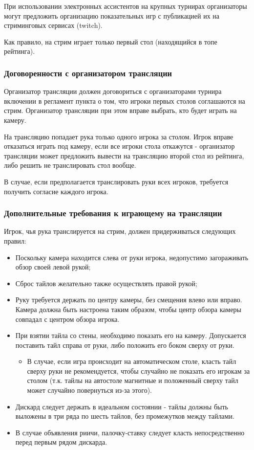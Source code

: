 При использовании электронных ассистентов на крупных турнирах организаторы могут предложить организацию показательных игр с публикацией их на стриминговых сервисах (twitch).

Как правило, на стрим играет только первый стол (находящийся в топе рейтинга).

\subsubsection{Договоренности с организатором трансляции}

Организатор трансляции должен договориться с организаторами турнира включении в регламент пункта о том, что игроки первых столов соглашаются на стрим. Организатор трансляции при этом вправе выбрать, кто будет играть на камеру.

На трансляцию попадает рука только одного игрока за столом. Игрок вправе отказаться играть под камеру, если все игроки стола откажутся - организатор трансляции может предложить вывести на трансляцию второй стол из рейтинга, либо решить не транслировать стол вообще.

В случае, если предполагается транслировать руки всех игроков, требуется получить согласие каждого игрока.

\subsubsection{Дополнительные требования к играющему на трансляции}

Игрок, чья рука транслируется на стрим, должен придерживаться следующих правил:
\begin{itemize}
	\item Поскольку камера находится слева от руки игрока, недопустимо загораживать обзор своей левой рукой;
	\item Сброс тайлов желательно также осуществлять правой рукой;
	\item Руку требуется держать по центру камеры, без смещения влево или вправо. Камера должна быть настроена таким образом, чтобы центр обзора камеры совпадал с центром обзора игрока.
	\item При взятии тайла со стены, необходимо показать его на камеру. Допускается поставить тайл справа от руки, либо положить его боком сверху от руки. 
	\begin{itemize}
		\item В случае, если игра происходит на автоматическом столе, класть тайл сверху руки не рекомендуется, чтобы случайно не показать его игрокам за столом (т.к. тайлы на автостоле магнитные и положенный сверху тайл может случайно повернуться из-за этого).
	\end{itemize}
	\item Дискард следует держать в идеальном состоянии - тайлы должны быть выложены в три ряда по шесть тайлов, без промежутков между тайлами. 
	\item В случае объявления риичи, палочку-ставку следует класть непосредственно перед первым рядом дискарда.
\end{itemize}

